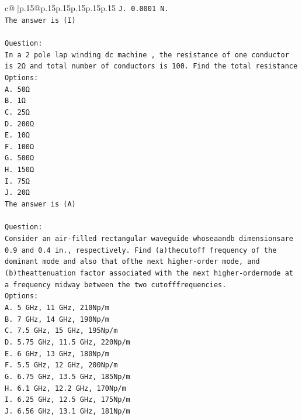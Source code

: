 \documentclass{article}
\begin{document}
{\begin{supertabular}{c@{$\;$}|p{.15\linewidth}@{}p{.15\linewidth}p{.15\linewidth}p{.15\linewidth}p{.15\linewidth}p{.15\linewidth}}
{{{\texttt{J. 0.0001 N.} \\
\texttt{The answer is (I)} \\
\\ 
\texttt{Question:} \\
\texttt{In a 2 pole lap winding dc machine , the resistance of one conductor is 2Ω and total number of conductors is 100. Find the total resistance} \\
\texttt{Options:} \\
\texttt{A. 50Ω} \\
\texttt{B. 1Ω} \\
\texttt{C. 25Ω} \\
\texttt{D. 200Ω} \\
\texttt{E. 10Ω} \\
\texttt{F. 100Ω} \\
\texttt{G. 500Ω} \\
\texttt{H. 150Ω} \\
\texttt{I. 75Ω} \\
\texttt{J. 20Ω} \\
\texttt{The answer is (A)} \\
\\ 
\texttt{Question:} \\
\texttt{Consider an air{-}filled rectangular waveguide whoseaandb dimensionsare 0.9 and 0.4 in., respectively. Find (a)thecutoff frequency of the dominant mode and also that ofthe next higher{-}order mode, and (b)theattenuation factor associated with the next higher{-}ordermode at a frequency midway between the two cutofffrequencies.} \\
\texttt{Options:} \\
\texttt{A. 5 GHz, 11 GHz, 210Np/m} \\
\texttt{B. 7 GHz, 14 GHz, 190Np/m} \\
\texttt{C. 7.5 GHz, 15 GHz, 195Np/m} \\
\texttt{D. 5.75 GHz, 11.5 GHz, 220Np/m} \\
\texttt{E. 6 GHz, 13 GHz, 180Np/m} \\
\texttt{F. 5.5 GHz, 12 GHz, 200Np/m} \\
\texttt{G. 6.75 GHz, 13.5 GHz, 185Np/m} \\
\texttt{H. 6.1 GHz, 12.2 GHz, 170Np/m} \\
\texttt{I. 6.25 GHz, 12.5 GHz, 175Np/m} \\
\texttt{J. 6.56 GHz, 13.1 GHz, 181Np/m} \\
            }
        }
    }
     \\ \\


\end{supertabular}}
\end{document}
